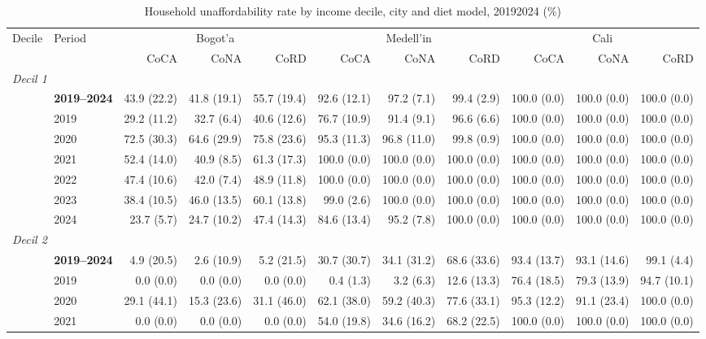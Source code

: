 \begin{table}[htbp]
\centering\small\setlength{\tabcolsep}{3pt}
\caption{Household unaffordability rate by income decile, city and diet model, 2019\textendash{}2024 (\%)}
\label{tab:afford_rate}
\begin{tabular}{llrrrrrrrrr}
\toprule
Decile & Period & \multicolumn{3}{c}{Bogot'{a}} & \multicolumn{3}{c}{Medell'{i}n} & \multicolumn{3}{c}{Cali} \\
 & & CoCA & CoNA & CoRD & CoCA & CoNA & CoRD & CoCA & CoNA & CoRD \\
\midrule
\multicolumn{11}{l}{\textit{Decil 1}} \\
 & \textbf{2019–2024} & 43.9 (22.2) & 41.8 (19.1) & 55.7 (19.4) & 92.6 (12.1) & 97.2 (7.1) & 99.4 (2.9) & 100.0 (0.0) & 100.0 (0.0) & 100.0 (0.0) \\
 & 2019 & 29.2 (11.2) & 32.7 (6.4) & 40.6 (12.6) & 76.7 (10.9) & 91.4 (9.1) & 96.6 (6.6) & 100.0 (0.0) & 100.0 (0.0) & 100.0 (0.0) \\
 & 2020 & 72.5 (30.3) & 64.6 (29.9) & 75.8 (23.6) & 95.3 (11.3) & 96.8 (11.0) & 99.8 (0.9) & 100.0 (0.0) & 100.0 (0.0) & 100.0 (0.0) \\
 & 2021 & 52.4 (14.0) & 40.9 (8.5) & 61.3 (17.3) & 100.0 (0.0) & 100.0 (0.0) & 100.0 (0.0) & 100.0 (0.0) & 100.0 (0.0) & 100.0 (0.0) \\
 & 2022 & 47.4 (10.6) & 42.0 (7.4) & 48.9 (11.8) & 100.0 (0.0) & 100.0 (0.0) & 100.0 (0.0) & 100.0 (0.0) & 100.0 (0.0) & 100.0 (0.0) \\
 & 2023 & 38.4 (10.5) & 46.0 (13.5) & 60.1 (13.8) & 99.0 (2.6) & 100.0 (0.0) & 100.0 (0.0) & 100.0 (0.0) & 100.0 (0.0) & 100.0 (0.0) \\
 & 2024 & 23.7 (5.7) & 24.7 (10.2) & 47.4 (14.3) & 84.6 (13.4) & 95.2 (7.8) & 100.0 (0.0) & 100.0 (0.0) & 100.0 (0.0) & 100.0 (0.0) \\
\midrule
\multicolumn{11}{l}{\textit{Decil 2}} \\
 & \textbf{2019–2024} & 4.9 (20.5) & 2.6 (10.9) & 5.2 (21.5) & 30.7 (30.7) & 34.1 (31.2) & 68.6 (33.6) & 93.4 (13.7) & 93.1 (14.6) & 99.1 (4.4) \\
 & 2019 & 0.0 (0.0) & 0.0 (0.0) & 0.0 (0.0) & 0.4 (1.3) & 3.2 (6.3) & 12.6 (13.3) & 76.4 (18.5) & 79.3 (13.9) & 94.7 (10.1) \\
 & 2020 & 29.1 (44.1) & 15.3 (23.6) & 31.1 (46.0) & 62.1 (38.0) & 59.2 (40.3) & 77.6 (33.1) & 95.3 (12.2) & 91.1 (23.4) & 100.0 (0.0) \\
 & 2021 & 0.0 (0.0) & 0.0 (0.0) & 0.0 (0.0) & 54.0 (19.8) & 34.6 (16.2) & 68.2 (22.5) & 100.0 (0.0) & 100.0 (0.0) & 100.0 (0.0) \\

\end{tabular}
\end{table}
